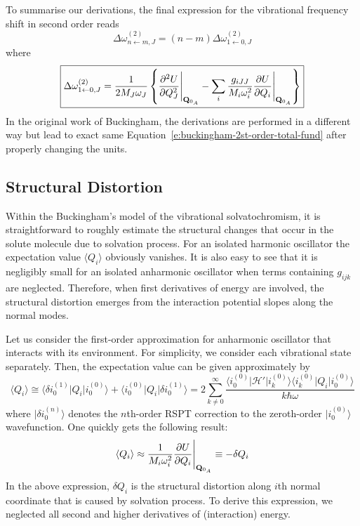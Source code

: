 \documentclass[a4paper,titlepage,twoside,fleqn,12pt]{book}
\begin{document}
\begin{refsection}
To summarise our derivations, the final expression for the vibrational frequency shift in 
second order reads
%
\begin{equation}  \label{e:buckingham-2st-order-total}
\boxed{
\Delta \omega_{n\leftarrow m,J}^{(2)} = \left( n-m \right) \Delta \omega_{1\leftarrow 0,J}^{(2)}
}
\end{equation}
%
where
%
\begin{equation}  \label{e:buckingham-2st-order-total-fund}
\boxed{
\Delta \omega_{1\leftarrow 0,J}^{(2)} = 
\frac{1}{2M_J\omega_J} 
\left\{
\frac{\partial^2 U}{\partial Q_J^2} \Bigg|_{{\bf Q}_{0_A}} 
%
- \sum_{i} \frac{g_{iJJ}}{M_i\omega_i^2} 
\frac{\partial U}{\partial Q_i} \Bigg|_{{\bf Q}_{0_A}}
\right\}
}
\end{equation}
%
In the original work of Buckingham, the derivations are performed in a different way
but lead to exact same Equation~\eqref{e:buckingham-2st-order-total-fund} 
after properly changing the units.

\subsection{Structural Distortion\label{s:structural-distortion-buckingham}}

Within the Buckingham's model of the vibrational solvatochromism,
it is straightforward to roughly estimate the structural changes
that occur in the solute molecule due to solvation process.
%
For an isolated harmonic oscillator the expectation value
$\langle Q_i \rangle$ obviously
vanishes. It is also easy to see that it is negligibly small
for an isolated anharmonic oscillator when terms containing $g_{ijk}$
are neglected. Therefore, when first derivatives of energy are involved,
the structural distortion emerges from the interaction potential slopes
along the normal modes.

Let us consider the first\hyp{}order approximation for anharmonic
oscillator that interacts with its environment.
For simplicity, we consider each vibrational state separately.
Then, the expectation value can be given approximately by
%
\begin{equation} 
\langle Q_i \rangle \cong 
\langle \delta i_0^{(1)} \vert Q_i \vert i_0^{(0)} \rangle + \langle i_0^{(0)} \vert Q_i \vert \delta i_0^{(1)} \rangle
= 2\sum_{k\ne 0}^{\infty} \frac{
\langle i_0^{(0)} \vert \mathscr{H}' \vert i_k^{(0)} \rangle \langle i_k^{(0)} \vert Q_i \vert i_0^{(0)} \rangle
}{k\hbar\omega}
\end{equation}
%
where $\vert \delta i_0^{(n)} \rangle$ denotes the $n$th\hyp{}order RSPT correction 
to the zeroth\hyp{}order $\vert i_0^{(0)} \rangle$ wavefunction.
One quickly gets the following result:
%
\begin{equation}  \label{e:buckingham-struct-dist}
\langle Q_i \rangle \approx \frac{1}{M_i\omega_i^2} \frac{\partial U}{\partial Q_i} \Bigg|_{{\bf Q}_{0_A}} \equiv -\delta Q_i
\end{equation}
%
In the above expression, $\delta Q_i$ is the structural distortion
along $i$th normal coordinate that is caused by solvation process. 
To derive this expression, we neglected all second and higher derivatives
of (interaction) energy.


\end{refsection}
\end{document}
